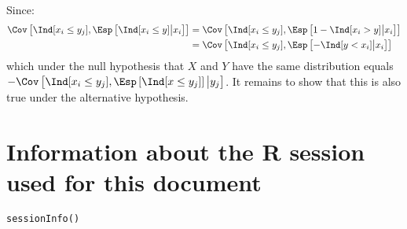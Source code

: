 \documentclass[12pt]{article}
\begin{document}
Since:
\begin{align*}
\Cov\left[\Ind[x_i \leq y_j],\Esp\left[ \Ind[x_i \leq y] \big| x_i\right]\right] &= \Cov\left[\Ind[x_i \leq y_j],\Esp\left[1- \Ind[x_i > y] \big| x_i\right]\right] \\
&= \Cov\left[\Ind[x_i \leq y_j],\Esp\left[- \Ind[y < x_i] \big| x_i\right]\right]
\end{align*}
which under the null hypothesis that \(X\) and \(Y\) have the same
distribution equals \(-\Cov\left[\Ind[x_i \leq y_j],\Esp\left[ \Ind[x
\leq y_j]\right] \big| y_j\right]\). It remains to show that this is
also true under the alternative hypothesis.



\clearpage 

\section{Information about the R session used for this document}
\label{sec:org3f24311}

\lstset{language=r,label= ,caption= ,captionpos=b,numbers=none}
\begin{lstlisting}
sessionInfo()
\end{lstlisting}
\end{document}
